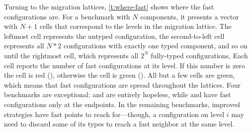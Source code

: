 Turning to the migration lattices, \cref{t:where-fast} shows where the fast
configurations are.
For a benchmark with $N$ components, it presents a vector with $N+1$ cells
that correspond to the levels in the migration lattice.
The leftmost cell represents the untyped configuration,
the second-to-left cell represents all $N * 2$ configurations with exactly one
typed component, and so on until the rightmost cell, which
represents all $2^N$ fully-typed configurations,
Each cell reports the number of fast configurations at its level.
If this number is zero the cell is red (\rboxtiny{}), otherwise
the cell is green (\gboxtiny{}).
All but a few cells are green, which means that fast configurations
are spread throughout the lattices.
Four benchmarks are exceptional:
 and  are entirely hopeless, while
 and  have fast configurations only
at the endpoints.
In the remaining benchmarks, improved strategies have fast points to
reach for---though, a configuration on level $i$ may need to discard
some of its types to reach a fast neighbor at the same level.

